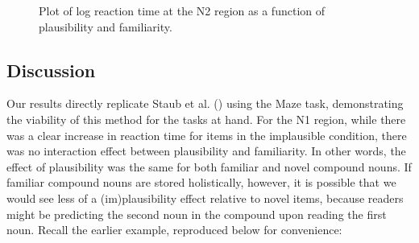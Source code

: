 \documentclass[
  12pt,
  letterpaper,
]{scrreprt}
\begin{document}
\begin{figure}[htbp]

\caption{\label{fig-N2Staub}Plot of log reaction time at the N2 region
as a function of plausibility and familiarity.}


\end{figure}%

\subsection{Discussion}\label{discussion}

Our results directly replicate Staub et al.
() using the Maze
task, demonstrating the viability of this method for the tasks at hand.
For the N1 region, while there was a clear increase in reaction time for
items in the implausible condition, there was no interaction effect
between plausibility and familiarity. In other words, the effect of
plausibility was the same for both familiar and novel compound nouns. If
familiar compound nouns are stored holistically, however, it is possible
that we would see less of a (im)plausibility effect relative to novel
items, because readers might be predicting the second noun in the
compound upon reading the first noun. Recall the earlier example,
reproduced below for convenience:
\end{document}
